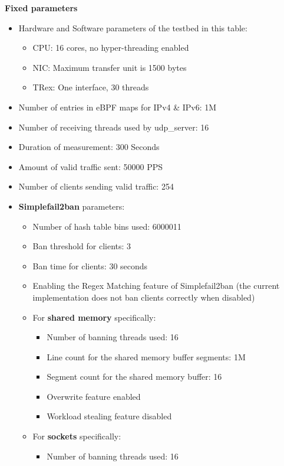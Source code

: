 \bigskip
\noindent
\textbf{Fixed parameters}
\begin{itemize}
    \item Hardware and Software parameters of the testbed in this table\@:
    \begin{itemize}
        \item \ac{CPU}\@: 16 cores, no hyper-threading enabled
        \item \ac{NIC}\@: Maximum transfer unit is 1500 bytes
        \item TRex\@: One interface, 30 threads
    \end{itemize}
    \item Number of entries in \ac{eBPF} maps for IPv4 \& IPv6\@: 1M
    \item Number of receiving threads used by udp\_server\@: 16
    \item Duration of measurement\@: 300 Seconds
    \item Amount of valid traffic sent\@: 50000 \ac{PPS}
    \item Number of clients sending valid traffic\@: 254
    \item \textbf{Simplefail2ban} parameters\@:
    \begin{itemize}
        \item Number of hash table bins used\@: 6000011
        \item Ban threshold for clients\@: 3
        \item Ban time for clients\@: 30 seconds
        \item Enabling the \ac{Regex} Matching feature of Simplefail2ban (the current implementation does not ban clients correctly when disabled)
        \item For \textbf{shared memory} specifically\@:
        \begin{itemize}
            \item Number of banning threads used\@: 16
            \item Line count for the shared memory buffer segments\@: 1M
            \item Segment count for the shared memory buffer\@: 16
            \item Overwrite feature enabled
            \item Workload stealing feature disabled
        \end{itemize}
        \item For \textbf{sockets} specifically\@:
        \begin{itemize}
            \item Number of banning threads used\@: 16

\end{itemize}
\end{itemize}
\end{itemize}
